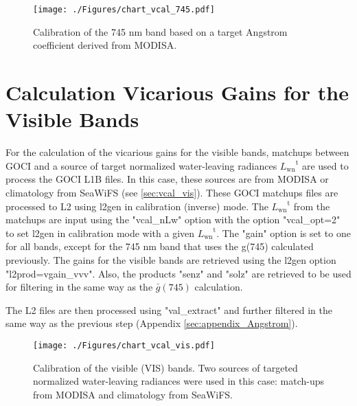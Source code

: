 \documentclass[]{interact}
\theoremstyle{plain}%
\theoremstyle{definition}
\theoremstyle{remark}
\begin{document}
\begin{figure}[H]
  \centering
  \texttt{[image: ./Figures/chart\_vcal\_745.pdf]}
    \caption{Calibration of the 745 nm band based on a target Angstrom coefficient derived from MODISA.  \label{fig:chart_vcal_745}} 
\end{figure}

\section{Calculation Vicarious Gains for the Visible Bands}\label{sec:appendix_VIS}
For the calculation of the vicarious gains for the visible bands, matchups between GOCI and a source of target normalized water-leaving radiances ${L_\text{wn}}^\text{t}$ are used to process the GOCI L1B files. In this case, these sources are from MODISA or climatology from SeaWiFS (see \autoref{sec:vcal_vis}). These GOCI matchups files are processed to L2 using l2gen in calibration (inverse) mode. The ${L_\text{wn}}^\text{t}$ from the matchups are input using the "vcal\_nLw" option with the option "vcal\_opt=2" to set l2gen in calibration mode with a given ${L_\text{wn}}^\text{t}$. The "gain" option is set to one for all bands, except for the 745 nm band that uses the g(745) calculated previously. The gains for the visible bands are retrieved using the l2gen option "l2prod=vgain\_vvv". Also, the products "senz" and "solz" are retrieved to be used for filtering in the same way as the $\bar{g}(745)$ calculation. 

The L2 files are then processed using "val\_extract" and further filtered in the same way as the previous step (Appendix \ref{sec:appendix_Angstrom}).
\begin{figure}[H]
  \centering
  \texttt{[image: ./Figures/chart\_vcal\_vis.pdf]}
    \caption{Calibration of the visible (VIS) bands. Two sources of targeted normalized water-leaving radiances were used in this case: match-ups from MODISA and climatology from SeaWiFS.  \label{fig:chart_vcal_vis}} 
\end{figure}
\end{document}
